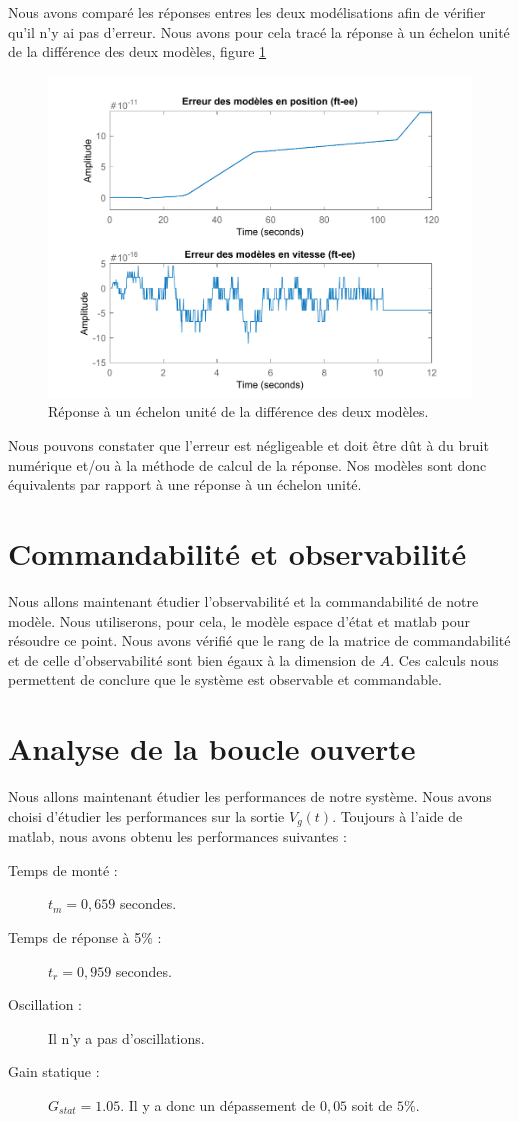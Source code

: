 Nous avons comparé les réponses entres les deux modélisations afin de vérifier qu'il n'y ai pas d'erreur. Nous avons pour cela tracé la réponse à un échelon unité de la différence des deux modèles, figure \ref{fig:errFT_EE}
\begin{figure}[!ht]
\centering
\includegraphics[width=.7\textwidth]{./I/images/erreurs_modeles_ft-ee.pdf}
\caption{\label{fig:errFT_EE} Réponse à un échelon unité de la différence des deux modèles.}
\end{figure}
Nous pouvons constater que l'erreur est négligeable et doit être dût à du bruit numérique et/ou à la méthode de calcul de la réponse. Nos modèles sont donc équivalents par rapport à une réponse à un échelon unité.
	\section{Commandabilité et observabilité}

Nous allons maintenant étudier l'observabilité et la commandabilité de notre modèle. Nous utiliserons, pour cela, le modèle espace d'état et matlab pour résoudre ce point. Nous avons vérifié que le rang de la matrice de commandabilité et de celle d'observabilité sont bien égaux à la dimension de $A$. Ces calculs nous permettent de conclure que le système est observable et commandable.
	\section{Analyse de la boucle ouverte}
Nous allons maintenant étudier les performances de notre système. Nous avons choisi d'étudier les performances sur la sortie $V_g(t)$. 
Toujours à l'aide de matlab, nous avons obtenu les performances suivantes : 
\begin{description}
\item[Temps de monté :] $t_m = 0,659 $ secondes.
\item[Temps de réponse à 5\% :] $t_r = 0,959$ secondes.
\item[Oscillation :] Il n'y a pas d'oscillations.
\item[Gain statique :] $G_{stat}= 1.05$. Il y a donc un dépassement de $0,05$ soit de $5\%$.	
\end{description}	

